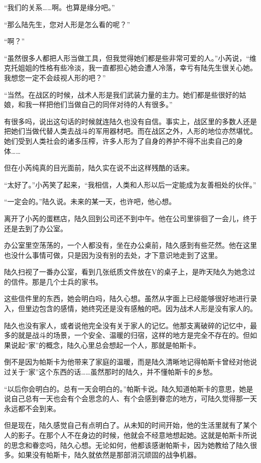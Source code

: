 “我们的关系……啊。也算是缘分吧。”

“那么陆先生，您对人形是怎么看的呢？”

“啊？”

“虽然很多人都把人形当做工具，但我觉得她们都是些非常可爱的人。”小芮说，“维克托姐姐的性格有些冷淡，我一直都担心她会遭人冷落，幸亏有陆先生很关心她。我想您一定不会歧视人形的吧？”

“当然。在战区的时候，战术人形是我们武装力量的主力。她们都是些很好的姑娘，和我一样把他们当做自己的同伴对待的人有很多。”

有很多吗，说出这句话的时候就连陆久也没有自信。事实上，战区里的多数人还是把她们当做代替人类去战斗的军用器材吧。而在战区之外，人形的地位亦然堪忧。她们受到人类社会的诸多压榨，许多人形为了自身的养护不得不出卖自己的身体……

但在小芮纯真的目光面前，陆久实在说不出这样残酷的话来。

“太好了。”小芮笑了起来，“我相信，人类和人形以后一定能成为友善相处的伙伴。”

“一定会的。”陆久说。未来的某一天，也许吧，他心想。



离开了小芮的蛋糕店，陆久回到公司还不到中午。他在公司里徘徊了一会儿，终于还是去到了办公室。

办公室里空荡荡的，一个人都没有，坐在办公桌前，陆久感到有些茫然。他在这里也没什么事情可做，只是因为没有别的去处，才下意识地走到了这里。

陆久扫视了一番办公室，看到几张纸质文件放在V的桌子上，是昨天陆久为她念过的信件。那是几个士兵的家书。

这些信件里的东西，她会明白吗，陆久心想。虽然从字面上已经能够很好地进行录入，但里边包含的感情，她终究还是没有感触的吧。因为战术人形是没有家人的。

陆久也没有家人，或者说他完全没有关于家人的记忆。他那支离破碎的记忆中，最多的就是战斗的场景，一个安全、温暖的归宿，这样的地方是完全不存在的。但如果说起“家”的概念，陆久心里总会想起一个人，那就是帕斯卡。

倒不是因为帕斯卡为他带来了家庭的温暖，而是陆久清晰地记得帕斯卡曾经对他说过关于“家”这个东西的话……虽然那时的陆久，并不懂帕斯卡的乡愁。

“以后你会明白的。总有一天会明白的。”帕斯卡说。陆久知道帕斯卡的意思，她是说自己总有一天也会有个会思念的人、有个会感到眷恋的地方，可陆久觉得那一天永远都不会到来。

但是现在，陆久感觉自己有点明白了。从未知的时间开始，他的生活里就有了某个人的影子。在那个人不在身边的时候，他就会不经意地想起她。这就是帕斯卡所说的思念和眷恋吗，陆久心想。无论如何，他都该感谢帕斯卡，因为她教给了陆久很多。如果没有帕斯卡，陆久就依然是那部消沉顽固的战争机器。

